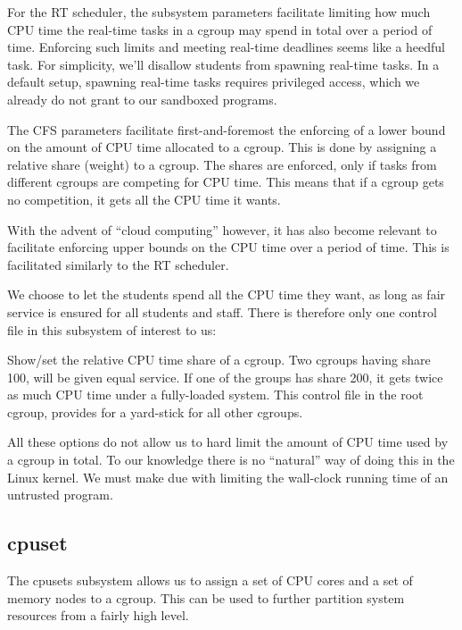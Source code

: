 For the RT scheduler, the subsystem parameters facilitate limiting how much CPU
time the real-time tasks in a cgroup may spend in total over a period of time.
Enforcing such limits and meeting real-time deadlines seems like a heedful
task. For simplicity, we'll disallow students from spawning real-time tasks. In
a default setup, spawning real-time tasks requires privileged access, which we
already do not grant to our sandboxed programs.

The CFS parameters facilitate first-and-foremost the enforcing of a lower bound
on the amount of CPU time allocated to a cgroup. This is done by assigning a
relative share (weight) to a cgroup. The shares are enforced, only if tasks
from different cgroups are competing for CPU time. This means that if a cgroup
gets no competition, it gets all the CPU time it wants.

With the advent of ``cloud computing'' however, it has also become relevant to
facilitate enforcing upper bounds on the CPU time over a period of
time\cite{turner-et-al-2010}. This is facilitated similarly to the RT scheduler.

We choose to let the students spend all the CPU time they want, as long as fair
service is ensured for all students and staff. There is therefore only one
control file in this subsystem of interest to us:

\begin{description}[\setleftmargin{0.2in}\breaklabel\setlabelstyle{\tt}]

\item[cpu.shares] Show/set the relative CPU time share of a cgroup. Two cgroups
having share 100, will be given equal service. If one of the groups has share
200, it gets twice as much CPU time under a fully-loaded system. This control
file in the root cgroup, provides for a yard-stick for all other cgroups.

\end{description}

All these options do not allow us to hard limit the amount of CPU time used by
a cgroup in total. To our knowledge there is no ``natural'' way of doing this
in the Linux kernel. We must make due with limiting the wall-clock running time
of an untrusted program.

\subsection{cpuset}

The cpusets subsystem allows us to assign a set of CPU cores and a set of
memory nodes to a cgroup. This can be used to further partition system
resources from a fairly high level.

